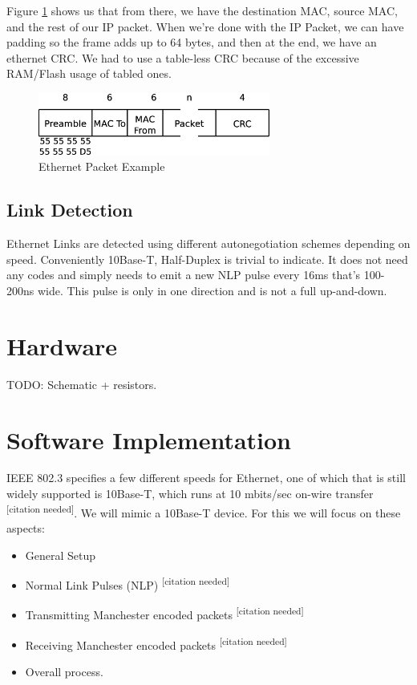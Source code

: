 \documentclass{article}
\begin{document}
Figure \ref{etherfarme} shows us that from there, we have the destination MAC, source MAC, and the rest of our IP packet.
When we're done with the IP Packet, we can have padding so the frame adds up to 64 bytes, and then at the end, we have an ethernet CRC.
We had to use a table-less CRC because of the excessive RAM/Flash usage of tabled ones.

\begin{figure}
    \centering
    \includegraphics[width=3.0in]{etherframe}
    \caption{Ethernet Packet Example}
    \label{etherfarme}
\end{figure}


\subsection{Link Detection}
Ethernet Links are detected using different autonegotiation schemes depending on speed.  Conveniently
10Base-T, Half-Duplex is trivial to indicate.  It does not need any codes and simply needs to emit
a new NLP pulse every 16ms that's 100-200ns wide.  This pulse is only in one direction and is not a full
up-and-down.

\section{Hardware}
TODO: Schematic + resistors.


\section{Software Implementation}
IEEE 802.3 specifies a few different speeds for Ethernet, one of which that is still
widely supported is 10Base-T, which runs at 10 mbits/sec on-wire transfer
\textsuperscript{[citation needed]}.  We will
mimic a 10Base-T device.  For this we will focus on these aspects:

\begin{itemize}
\item General Setup
\item Normal Link Pulses (NLP) \textsuperscript{[citation needed]}
\item Transmitting Manchester encoded packets \textsuperscript{[citation needed]}
\item Receiving Manchester encoded packets \textsuperscript{[citation needed]}
\item Overall process.
\end{itemize}
\end{document}

